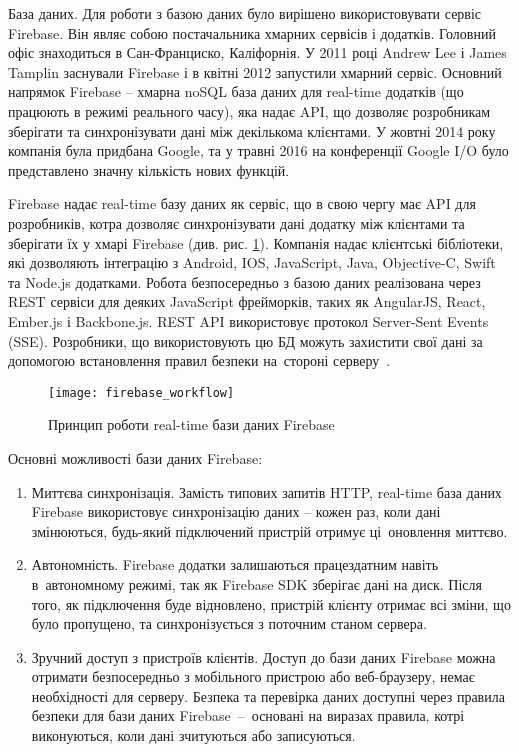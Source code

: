 \documentclass[../main.tex]{subfiles}
\begin{document}

База даних.
Для роботи з базою даних було вирішено використовувати сервіс Firebase. Він являє собою постачальника хмарних сервісів і додатків. Головний офіс знаходиться в Сан-Франциско, Каліфорнія. У 2011 році Andrew Lee і James Tamplin заснували Firebase і в квітні 2012 запустили хмарний сервіс. Основний напрямок Firebase -- хмарна noSQL база даних для real-time додатків (що працюють в режимі реального часу), яка надає API, що дозволяє розробникам зберігати та синхронізувати дані між декількома клієнтами. У жовтні 2014 року компанія була придбана Google, та у травні 2016 на конференції Google I/O було представлено значну кількість нових функцій.

Firebase надає real-time базу даних як сервіс, що в свою чергу має API для розробників, котра дозволяє синхронізувати дані додатку між клієнтами та зберігати їх у хмарі Firebase (див. рис. \ref{figure:firebase_workflow}). Компанія надає клієнтські бібліотеки, які дозволяють інтеграцію з Android, IOS, JavaScript, Java, Objective-C, Swift та Node.js додатками. Робота безпосередньо з базою даних реалізована через REST сервіси для деяких JavaScript фрейморків, таких як AngularJS, React, Ember.js і Backbone.js. REST API використовує протокол Server-Sent Events (SSE). Розробники, що використовують цю БД можуть захистити свої дані за допомогою встановлення правил безпеки на~стороні серверу~\cite{firebase_secure}.

\begin{figure}[H]
	\centering
	\texttt{[image: firebase\_workflow]}
	\caption{Принцип роботи real-time бази даних Firebase}
	\label{figure:firebase_workflow}
\end{figure}

Основні можливості бази даних Firebase:
\begin{enumerate}
	\item Миттєва синхронізація. Замість типових запитів HTTP, real-time база даних Firebase використовує синхронізацію даних -- кожен раз, коли дані змінюються, будь-який підключений пристрій отримує ці~оновлення миттєво.
	\item Автономність. Firebase додатки залишаються працездатним навіть в~автономному режимі, так як Firebase SDK зберігає дані на диск. Після того, як підключення буде відновлено, пристрій клієнту отримає всі зміни, що було пропущено, та синхронізується з поточним станом сервера.
	\item Зручний доступ з пристроїв клієнтів. Доступ до бази даних Firebase можна отримати безпосередньо з мобільного пристрою або веб-браузеру, немає необхідності для серверу. Безпека та перевірка даних доступні через правила безпеки для бази даних Firebase~--~основані на виразах правила, котрі виконуються, коли дані зчитуються або записуються.
\end{enumerate}
\end{document}
